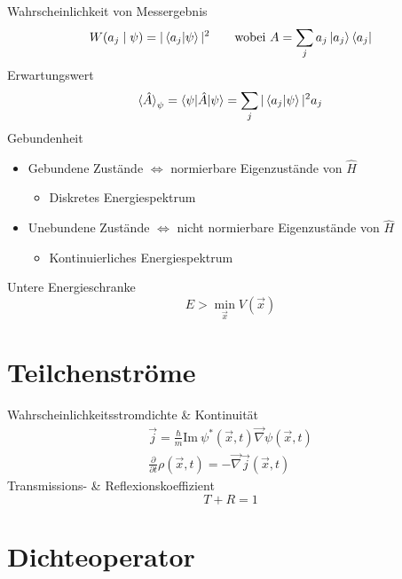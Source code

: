 Wahrscheinlichkeit von Messergebnis \cite[Glg. 2.12]{qm}
\begin{equation*}
	W(a_j\mid\psi)=|\braket{a_j|\psi}|^2 \qquad \text{wobei} \ A=\sum_ja_j\ket{a_j}\bra{a_j}
\end{equation*}
Erwartungswert \cite[Glg. 2.16, S. 33]{qm}
\begin{equation*}
	\braket{\hat{A}}_\psi = \braket{\psi|\hat{A}|\psi} = \sum_j|\braket{a_j|\psi}|^2a_j
\end{equation*}
Gebundenheit \cite[Kap. 4.1.1]{qm}
\begin{itemize}
    \item Gebundene Zustände $\Leftrightarrow$ normierbare Eigenzustände von $\hat{H}$
    \begin{itemize}
        \item Diskretes Energiespektrum
    \end{itemize}
    \item Unebundene Zustände $\Leftrightarrow$ nicht normierbare Eigenzustände von $\hat{H}$
    \begin{itemize}
        \item Kontinuierliches Energiespektrum
    \end{itemize}
\end{itemize}
Untere Energieschranke \cite[Glg. 4.31]{qm}
\begin{equation*}
	E > \min_{\vec{x}}V(\vec{x})
\end{equation*}

\section{Teilchenströme}

Wahrscheinlichkeitsstromdichte \& Kontinuität \cite[Glg. 4.38]{qm}
\begin{gather*}
	\vec{j} = \frac{\hbar}{m}\text{Im}\ \psi^*(\vec{x},t)\vec{\nabla}\psi(\vec{x},t) \\
	\frac{\partial}{\partial t}\rho(\vec{x},t) = -\vec{\nabla}\vec{j}(\vec{x},t)
\end{gather*}
Transmissions- \& Reflexionskoeffizient \cite[S. 116]{qm}
\begin{equation*}
	T + R = 1
\end{equation*}

\section{Dichteoperator}

